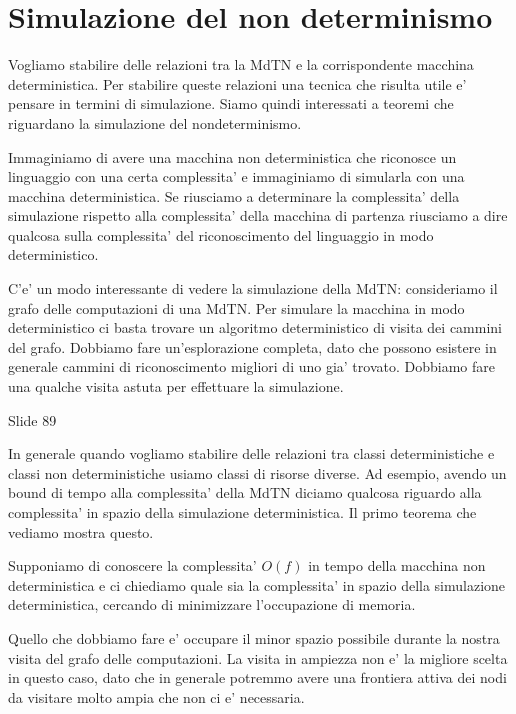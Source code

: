 
\section{Simulazione del non determinismo}

Vogliamo stabilire delle relazioni tra la MdTN e la corrispondente macchina deterministica. Per
stabilire queste relazioni una tecnica che risulta utile e' pensare in termini di simulazione.
Siamo quindi interessati a teoremi che riguardano la simulazione del nondeterminismo.

Immaginiamo di avere una macchina non deterministica che riconosce un linguaggio con una certa
complessita' e immaginiamo di simularla con una macchina deterministica. Se riusciamo a determinare
la complessita' della simulazione rispetto alla complessita' della macchina di partenza riusciamo a
dire qualcosa sulla complessita' del riconoscimento del linguaggio in modo deterministico.

C'e' un modo interessante di vedere la simulazione della MdTN: consideriamo il grafo delle
computazioni di una MdTN. Per simulare la macchina in modo deterministico ci basta trovare un
algoritmo deterministico di visita dei cammini del grafo. Dobbiamo fare un'esplorazione completa,
dato che possono esistere in generale cammini di riconoscimento migliori di uno gia' trovato.
Dobbiamo fare una qualche visita astuta per effettuare la simulazione.

Slide 89

In generale quando vogliamo stabilire delle relazioni tra classi deterministiche e classi non
deterministiche usiamo classi di risorse diverse. Ad esempio, avendo un bound di tempo alla
complessita' della MdTN diciamo qualcosa riguardo alla complessita' in spazio della simulazione
deterministica. Il primo teorema che vediamo mostra questo.

Supponiamo di conoscere la complessita' $O(f)$ in tempo della macchina non deterministica e ci
chiediamo quale sia la complessita' in spazio della simulazione deterministica, cercando di
minimizzare l'occupazione di memoria.

Quello che dobbiamo fare e' occupare il minor spazio possibile durante la nostra visita del grafo
delle computazioni. La visita in ampiezza non e' la migliore scelta in questo caso, dato che in
generale potremmo avere una frontiera attiva dei nodi da visitare molto ampia che non ci e'
necessaria.

